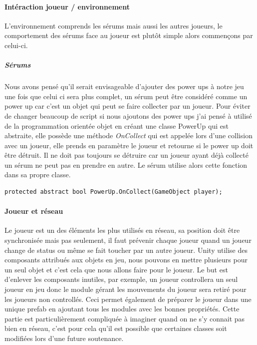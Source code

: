 \documentclass{article}
\begin{document}
\paragraph{Intéraction joueur / environnement}

L'environnement comprends les sérums mais aussi les autres joueurs, le comportement des sérums face au joueur est plutôt simple alors commençons par celui-ci.

\subparagraph{Sérums}

Nous avons pensé qu'il serait envisageable d'ajouter des power ups à notre jeu une fois que celui ci sera plus complet, un sérum peut être considéré comme un power up car c'est un objet qui peut se faire collecter par un joueur. Pour éviter de changer beaucoup de script si nous ajoutons des power ups j'ai pensé à utilisé de la programmation orientée objet en créant une classe PowerUp qui est abstraite, elle possède une méthode \emph{OnCollect} qui est appelée lors d'une collision avec un joueur, elle prends en paramètre le joueur et retourne si le power up doit être détruit. Il ne doit pas toujours se détruire car un joueur ayant déjà collecté un sérum ne peut pas en prendre en autre. Le sérum utilise alors cette fonction dans sa propre classe.

\begin{lstlisting}
protected abstract bool PowerUp.OnCollect(GameObject player);
\end{lstlisting}


\paragraph{Joueur et réseau}

Le joueur est un des éléments les plus utilisés en réseau, sa position doit être synchronisée mais pas seulement, il faut prévenir chaque joueur quand un joueur change de status ou même se fait toucher par un autre joueur. Unity utilise des composants attribués aux objets en jeu, nous pouvons en mettre plusieurs pour un seul objet et c'est cela que nous allons faire pour le joueur. Le but est d'enlever les composants inutiles, par exemple, un joueur controllera un seul joueur en jeu donc le module gérant les mouvements du joueur sera retiré pour les joueurs non controllés. Ceci permet également de préparer le joueur dans une unique prefab en ajoutant tous les modules avec les bonnes propriétés.
Cette partie est particulièrement compliquée à imaginer quand on ne s'y connait pas bien en réseau, c'est pour cela qu'il est possible que certaines classes soit modifiées lors d'une future soutenance.
\end{document}
